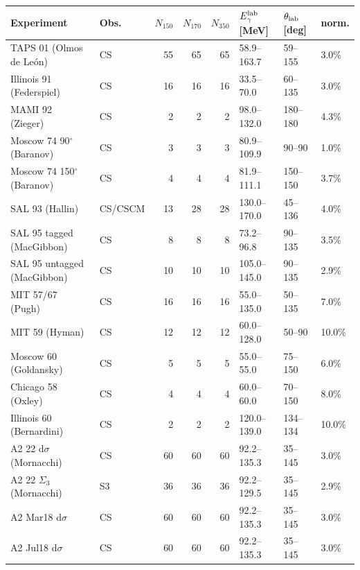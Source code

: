 \begin{tabular}{llrrrlll}
\hline
Experiment & Obs. & $N_{150}$ & $N_{170}$ & $N_{350}$ & $E_\gamma^{\rm lab}$ [MeV] & $\theta_{\rm lab}$ [deg] & norm. \\
\hline
TAPS 01 (Olmos de León)~\cite{deLeon:2001dnx} & CS & 55 & 65 & 65 & 58.9--163.7 & 59--155 & 3.0\% \\
Illinois 91 (Federspiel)~\cite{Federspiel:1991yd} & CS & 16 & 16 & 16 & 33.5--70.0 & 60--135 & 3.0\% \\
MAMI 92 (Zieger)~\cite{Zieger:1992jq} & CS & 2 & 2 & 2 & 98.0--132.0 & 180--180 & 4.3\% \\
Moscow 74 90$^\circ$ (Baranov)~\cite{Baranov:1974ec,Baranov:1975ju} & CS & 3 & 3 & 3 & 80.9--109.9 & 90--90 & 1.0\% \\
Moscow 74 150$^\circ$ (Baranov)~\cite{Baranov:1974ec,Baranov:1975ju} & CS & 4 & 4 & 4 & 81.9--111.1 & 150--150 & 3.7\% \\
SAL 93 (Hallin)~\cite{Hallin:1993ft} & CS/CSCM & 13 & 28 & 28 & 130.0--170.0 & 45--136 & 4.0\% \\
SAL 95 tagged (MacGibbon)~\cite{MacGibbon:1995in} & CS & 8 & 8 & 8 & 73.2--96.8 & 90--135 & 3.5\% \\
SAL 95 untagged (MacGibbon)~\cite{MacGibbon:1995in} & CS & 10 & 10 & 10 & 105.0--145.0 & 90--135 & 2.9\% \\
MIT 57/67 (Pugh)~\cite{Pugh:1957zz} & CS & 16 & 16 & 16 & 55.0--135.0 & 50--135 & 7.0\% \\
MIT 59 (Hyman)~\cite{Hyman:1959zz} & CS & 12 & 12 & 12 & 60.0--128.0 & 50--90 & 10.0\% \\
Moscow 60 (Goldansky)~\cite{Goldansky:1960} & CS & 5 & 5 & 5 & 55.0--55.0 & 75--150 & 6.0\% \\
Chicago 58 (Oxley)~\cite{Oxley:1958zz} & CS & 4 & 4 & 4 & 60.0--60.0 & 70--150 & 8.0\% \\
Illinois 60 (Bernardini)~\cite{Bernardini:1960wya} & CS & 2 & 2 & 2 & 120.0--139.0 & 134--134 & 10.0\% \\
A2 22 d$\sigma$ (Mornacchi)~\cite{A2:2021wmm} & CS & 60 & 60 & 60 & 92.2--135.3 & 35--145 & 3.0\% \\
A2 22 $\Sigma_{3}$ (Mornacchi)~\cite{A2:2021wmm} & S3 & 36 & 36 & 36 & 92.2--129.5 & 35--145 & 2.9\% \\
A2 Mar18 d$\sigma$~\cite{Mornacchi thesis} & CS & 60 & 60 & 60 & 92.2--135.3 & 35--145 & 3.0\% \\
A2 Jul18 d$\sigma$~\cite{Mornacchi thesis} & CS & 60 & 60 & 60 & 92.2--135.3 & 35--145 & 3.0\% \\

\end{tabular}

